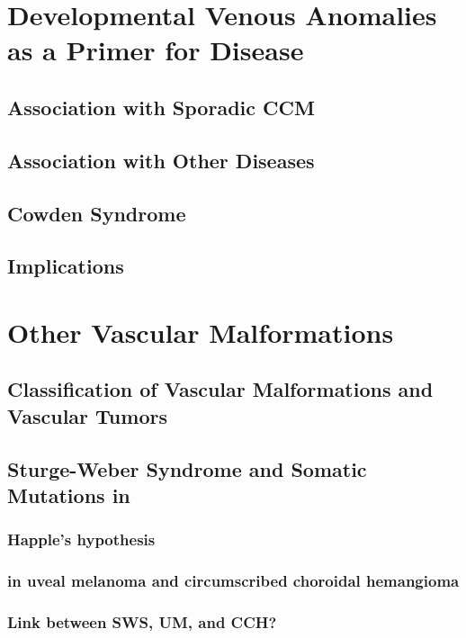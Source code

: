 \section{Developmental Venous Anomalies as a Primer for Disease}
\subsection{Association with Sporadic CCM}
\subsection{Association with Other Diseases}
\subsection{Cowden Syndrome}
\subsection{Implications}













\section{Other Vascular Malformations}
\subsection{Classification of Vascular Malformations and Vascular Tumors}

\subsection{Sturge-Weber Syndrome and Somatic Mutations in }
\subsubsection{Happle's hypothesis}
\subsubsection{ in uveal melanoma and circumscribed choroidal hemangioma}
\subsubsection{Link between SWS, UM, and CCH?}

